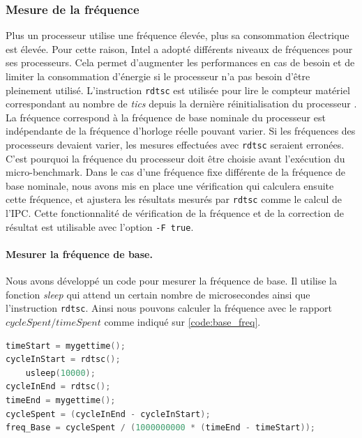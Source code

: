     \subsubsection{Mesure de la fréquence}
        Plus un processeur utilise une fréquence élevée, plus sa consommation électrique est élevée. Pour cette raison, Intel a adopté différents niveaux de fréquences pour ses processeurs. Cela permet d'augmenter les performances en cas de besoin et de limiter la consommation d'énergie si le processeur n'a pas besoin d'être pleinement utilisé. L'instruction \verb|rdtsc| est utilisée pour lire le compteur matériel correspondant au nombre de \textit{tics} depuis la dernière réinitialisation du processeur \cite{code:rdtsc}. La fréquence correspond à la fréquence de base nominale du processeur est indépendante de la fréquence d'horloge réelle pouvant varier. Si les fréquences des processeurs devaient varier, les mesures effectuées avec \verb|rdtsc| seraient erronées. C'est pourquoi la fréquence du processeur doit être choisie avant l'exécution du micro-benchmark. Dans le cas d'une fréquence fixe différente de la fréquence de base nominale, nous avons mis en place une vérification qui calculera ensuite cette fréquence, et ajustera les résultats mesurés par \verb|rdtsc| comme le calcul de l'IPC. Cette fonctionnalité de vérification de la fréquence et de la correction de résultat est utilisable avec l'option \verb|-F true|. 
        
        \paragraph{Mesurer la fréquence de base.} Nous avons développé un code pour mesurer la fréquence de base. Il utilise la fonction \textit{sleep} qui attend un certain nombre de microsecondes ainsi que l'instruction \verb|rdtsc|. Ainsi nous pouvons calculer la fréquence avec le rapport $cycleSpent / timeSpent$ comme indiqué sur \autoref{code:base_freq}. 
        

\begin{lstlisting}[label=code:base_freq ,language=C, caption=Code used to measure the base frequency of the processor]
timeStart = mygettime();
cycleInStart = rdtsc();
    usleep(10000);
cycleInEnd = rdtsc();
timeEnd = mygettime();
cycleSpent = (cycleInEnd - cycleInStart);
freq_Base = cycleSpent / (1000000000 * (timeEnd - timeStart));
\end{lstlisting}        

